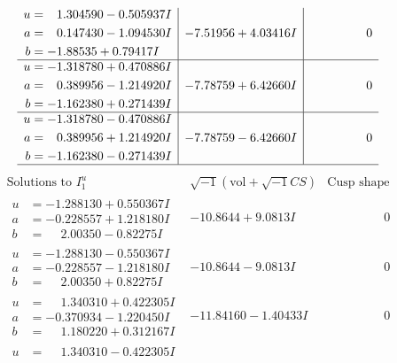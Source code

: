 \documentclass[1p]{elsarticle_modified}
\theoremstyle{definition}
\newcommand{\I}{\sqrt{-1}}
\begin{document}
$$\begin{array}{c|c|c}
\begin{aligned}
u &= \phantom{-}1.304590 - 0.505937 I \\
a &= \phantom{-}0.147430 - 1.094530 I \\
b &= -1.88535 + 0.79417 I\end{aligned}
 & -7.51956 + 4.03416 I & \phantom{-0.000000 } 0 \\ \hline\begin{aligned}
u &= -1.318780 + 0.470886 I \\
a &= \phantom{-}0.389956 - 1.214920 I \\
b &= -1.162380 + 0.271439 I\end{aligned}
 & -7.78759 + 6.42660 I & \phantom{-0.000000 } 0 \\ \hline\begin{aligned}
u &= -1.318780 - 0.470886 I \\
a &= \phantom{-}0.389956 + 1.214920 I \\
b &= -1.162380 - 0.271439 I\end{aligned}
 & -7.78759 - 6.42660 I & \phantom{-0.000000 } 0\\
 \hline 
 \end{array}$$\newpage$$\begin{array}{c|c|c}  
\text{Solutions to }I^u_{1}& \I (\text{vol} + \sqrt{-1}CS) & \text{Cusp shape}\\
 \hline 
\begin{aligned}
u &= -1.288130 + 0.550367 I \\
a &= -0.228557 + 1.218180 I \\
b &= \phantom{-}2.00350 - 0.82275 I\end{aligned}
 & -10.8644 + 9.0813 I & \phantom{-0.000000 } 0 \\ \hline\begin{aligned}
u &= -1.288130 - 0.550367 I \\
a &= -0.228557 - 1.218180 I \\
b &= \phantom{-}2.00350 + 0.82275 I\end{aligned}
 & -10.8644 - 9.0813 I & \phantom{-0.000000 } 0 \\ \hline\begin{aligned}
u &= \phantom{-}1.340310 + 0.422305 I \\
a &= -0.370934 - 1.220450 I \\
b &= \phantom{-}1.180220 + 0.312167 I\end{aligned}
 & -11.84160 - 1.40433 I & \phantom{-0.000000 } 0 \\ \hline\begin{aligned}
u &= \phantom{-}1.340310 - 0.422305 I \\

\end{aligned}
\end{array}$$
\end{document}

